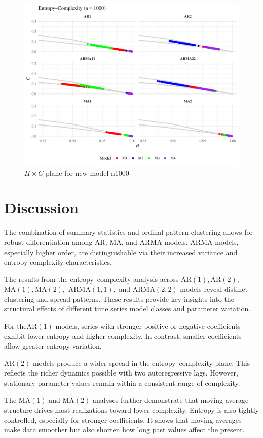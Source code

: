 \documentclass[12pt,a4paper]{article}
\begin{document}
\begin{figure}[H]
	\includegraphics[width=0.9 \textwidth]{New_model_group_plot_n1000}
	\caption{$H \times C$ plane for new model n1000}
	\label{fig:HC new n1000}
\end{figure}

\section{Discussion}
The combination of summary statistics and ordinal pattern clustering allows for robust differentiation among AR, MA, and ARMA models. ARMA models, especially higher order, are distinguishable via their increased variance and entropy-complexity characteristics.

The results from the entropy–complexity analysis across $\mathrm{AR}(1), \mathrm{AR}(2)$, $\mathrm{MA}(1), \mathrm{MA}(2),$ $\mathrm{ARMA}(1,1),$ and $\mathrm{ARMA}(2,2)$ models reveal distinct clustering and spread patterns. These results provide key insights into the structural effects of different time series model classes and parameter variation.

For the$\mathrm{AR}(1)$ models, series with stronger positive or negative coefficients exhibit lower entropy and higher complexity. In contrast, smaller coefficients allow greater entropy variation. 

$\mathrm{AR}(2)$ models produce a wider spread in the entropy–complexity plane. This reflects the richer dynamics possible with two autoregressive lags. However, stationary parameter values remain within a consistent range of complexity.

The $\mathrm{MA}(1)$ and $\mathrm{MA}(2)$ analyses further demonstrate that moving average structure drives most realizations toward lower complexity. Entropy is also tightly controlled, especially for stronger coefficients. It shows that moving averages make data smoother but also shorten how long past values affect the present.
\end{document}
